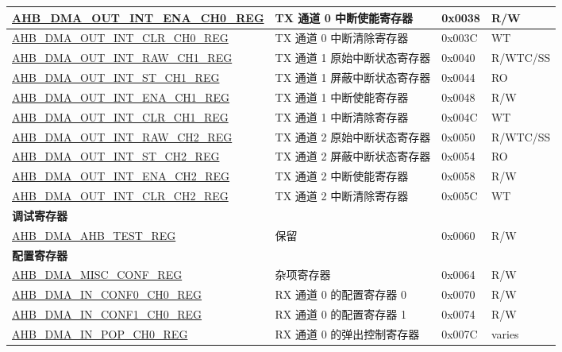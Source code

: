 \begin{longtable}{ | p{8cm} | p{8cm} | p{1.3cm} | p{1.5cm} | }
\hyperref[regdesc:AHBDMAOUTINTENACHNREG]{AHB\_DMA\_OUT\_INT\_ENA\_CH0\_REG} & TX 通道 0 中断使能寄存器 & 0x0038 & R/W \\ \hline
\hyperref[regdesc:AHBDMAOUTINTCLRCHNREG]{AHB\_DMA\_OUT\_INT\_CLR\_CH0\_REG} & TX 通道 0 中断清除寄存器 & 0x003C & WT \\ \hline
\hyperref[regdesc:AHBDMAOUTINTRAWCHNREG]{AHB\_DMA\_OUT\_INT\_RAW\_CH1\_REG} & TX 通道 1 原始中断状态寄存器 & 0x0040 & R/WTC/SS \\ \hline
\hyperref[regdesc:AHBDMAOUTINTSTCHNREG]{AHB\_DMA\_OUT\_INT\_ST\_CH1\_REG} & TX 通道 1 屏蔽中断状态寄存器 & 0x0044 & RO \\ \hline
\hyperref[regdesc:AHBDMAOUTINTENACHNREG]{AHB\_DMA\_OUT\_INT\_ENA\_CH1\_REG} & TX 通道 1 中断使能寄存器 & 0x0048 & R/W \\ \hline
\hyperref[regdesc:AHBDMAOUTINTCLRCHNREG]{AHB\_DMA\_OUT\_INT\_CLR\_CH1\_REG} & TX 通道 1 中断清除寄存器 & 0x004C & WT \\ \hline
\hyperref[regdesc:AHBDMAOUTINTRAWCHNREG]{AHB\_DMA\_OUT\_INT\_RAW\_CH2\_REG} & TX 通道 2 原始中断状态寄存器 & 0x0050 & R/WTC/SS \\ \hline
\hyperref[regdesc:AHBDMAOUTINTSTCHNREG]{AHB\_DMA\_OUT\_INT\_ST\_CH2\_REG} & TX 通道 2 屏蔽中断状态寄存器 & 0x0054 & RO \\ \hline
\hyperref[regdesc:AHBDMAOUTINTENACHNREG]{AHB\_DMA\_OUT\_INT\_ENA\_CH2\_REG} & TX 通道 2 中断使能寄存器 & 0x0058 & R/W \\ \hline
\hyperref[regdesc:AHBDMAOUTINTCLRCHNREG]{AHB\_DMA\_OUT\_INT\_CLR\_CH2\_REG} & TX 通道 2 中断清除寄存器 & 0x005C & WT \\ \hline
\multicolumn{4}{|l|}{\textbf{调试寄存器}} \\ \hline
\hyperref[regdesc:AHBDMAAHBTESTREG]{AHB\_DMA\_AHB\_TEST\_REG} & 保留 & 0x0060 & R/W \\ \hline
\multicolumn{4}{|l|}{\textbf{配置寄存器}} \\ \hline
\hyperref[regdesc:AHBDMAMISCCONFREG]{AHB\_DMA\_MISC\_CONF\_REG} & 杂项寄存器 & 0x0064 & R/W \\ \hline
\hyperref[regdesc:AHBDMAINCONF0CHNREG]{AHB\_DMA\_IN\_CONF0\_CH0\_REG} & RX 通道 0 的配置寄存器 0 & 0x0070 & R/W \\ \hline
\hyperref[regdesc:AHBDMAINCONF1CHNREG]{AHB\_DMA\_IN\_CONF1\_CH0\_REG} & RX 通道 0 的配置寄存器 1 & 0x0074 & R/W \\ \hline
\hyperref[regdesc:AHBDMAINPOPCHNREG]{AHB\_DMA\_IN\_POP\_CH0\_REG} & RX 通道 0 的弹出控制寄存器 & 0x007C & varies \\ \hline

\end{longtable}
